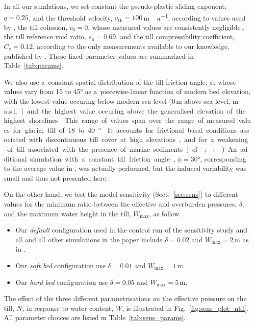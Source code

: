 \documentclass[tc, manuscript]{copernicus}
\begin{document}
      In all our sumlations, we set constant the pseudo-plastic sliding
      exponent, $q=0.25$, and the threshold velocity,
      $v_{\text{th}}=100$\,\unit{m\,a^{-1}}, according to values used by
      \citet{Aschwanden.etal.2013}, the till cohesion, $c_0=0$, whose
      measured values are consistently negligible
      \citep[p.~268]{Tulaczyk.etal.2000, Cuffey.Paterson.2010}, the till
      reference void ratio, $e_0=0.69$, and the till compressibility
      coefficient, $C_{\mathrm{c}}=0.12$, according to the only measurements
      available to our knowledge, published by \citep{Tulaczyk.etal.2000}.
      These fixed parameter values are summarized in Table~\ref{tab:params}.

      We also use a~constant spatial distribution of the till friction
      angle, $\phi$, whose values vary from 15 to 45\unit{\degree} as
      a~piecewise-linear function of modern bed elevation, with the lowest
      value occuring below modern sea level (0\,\unit{m} above sea level,
      \unit{m\,a.s.l.}) and the highest value occuring above the generalised
      elevation of the highest shorelines
      \citep[200\,\unit{m\,a.s.l.},][Fig.~5]{Clague.1981}. This range of
      values span over the range of measured values for glacial till of 18
      to 40\unit{\degree} \citep[p.~268]{Cuffey.Paterson.2010}. It accounts
      for frictional basal conditions associated with discontinuous till
      cover at high elevations, and for a~weakening of till associated with
      the presence of marine sediments (cf. \citealp{Martin.etal.2011};
      \citealp[Supplement]{Aschwanden.etal.2013};
      \citealp{PISM-authors.2015}).

      An additional simulation with a~constant till friction angle,
      $\phi=30$\unit{\degree}, corresponding to the average value in
      \citet[p.~268]{Cuffey.Paterson.2010}, was actually performed, but the
      induced variability was small and thus not presented here.

      On the other hand, we test the model sensitivity
      (Sect.~\ref{sec:sens}) to different values for the minimum ratio
      between the effective and overburden pressures, $\delta$, and the
      maximum water height in the till, $W_{\text{max}}$, as follow.
%
\begin{itemize}
  \item Our \emph{default} configuration used in the control run of the
    sensitivity study and all and all other simulations in the paper include
    $\delta=0.02$ and $W_{\text{max}}=2$\,\unit{m} as in
    \citet{Bueler.Pelt.2015}.
  \item Our \emph{soft bed} configuration use $\delta=0.01$ and
    $W_{\text{max}}=1$\,\unit{m}.
  \item Our \emph{hard bed} configuration use $\delta=0.05$ and
    $W_{\text{max}}=5$\,\unit{m}.
\end{itemize}
%
      The effect of the three different parametrisations on the effective
      pressure on the till, $N$, in response to water content, $W$, is
      illustrated in Fig.~\ref{fig:sens_plot_ntil}. All parameter choices
      are listed in Table~\ref{tab:sens_params}.
\end{document}
